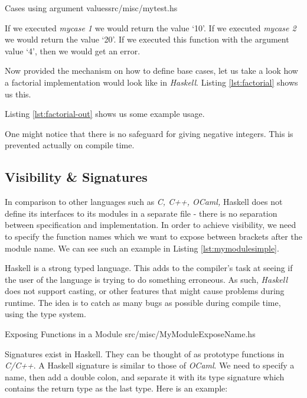 %
            {Cases using argument values}{src/misc/mytest.hs}

If we executed \textit{mycase 1} we would return the value `10'. If we executed
\textit{mycase 2} we would return the value `20'. If we executed this function
with the argument value `4', then we would get an error.

Now provided the mechanism on how to define base cases, let us take a look how
a factorial implementation would look like in \textit{Haskell}. Listing
\ref{lst:factorial} shows us this.


Listing \ref{lst:factorial-out} shows us some example usage.


One might notice that there is no safeguard for giving negative integers. This
is prevented actually on compile time.

\subsection{Visibility \& Signatures} 

In comparison to other languages such as \textit{C, C++, OCaml,} Haskell does
not define its interfaces to its modules in a separate file - there is no
separation between specification and implementation. In order to achieve
visibility, we need to specify the function names which we want to expose
between brackets after the module name. We can see such an example in Listing
\ref{lst:mymodulesimple}.

Haskell is a strong typed language. This adds to the compiler's task at seeing
if the user of the language is trying to do something erroneous. As such, 
\textit{Haskell} does not support casting, or other features that might cause
problems during runtime. The idea is to catch as many bugs as possible during
compile time, using the type system.

%
            {Exposing Functions in a Module}%
            {src/misc/MyModuleExposeName.hs}

Signatures exist in Haskell. They can be thought of as prototype functions in
\textit{C/C++}. A Haskell signature is similar to those of \textit{OCaml}. We
need to specify a name, then add a double colon, and separate it with its
type signature which contains the return type as the last type. Here is an 
example:

